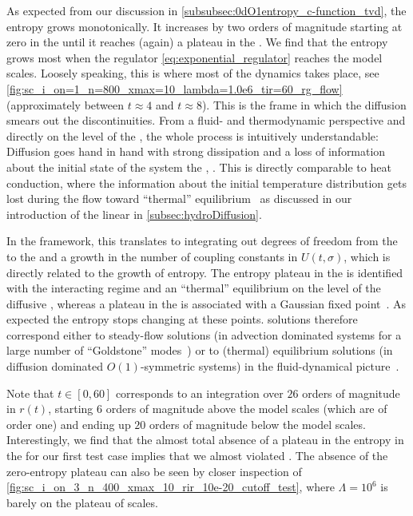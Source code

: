 As expected from our discussion in \cref{subsubsec:0dO1entropy_c-function_tvd}, the entropy grows monotonically.
It increases by two orders of magnitude starting at zero in the \uv{} until it reaches (again) a plateau in the \ir{}.
We find that the entropy grows most when the regulator \eqref{eq:exponential_regulator} reaches the model scales.
Loosely speaking, this is where most of the dynamics takes place, see \cref{fig:sc_i_on=1_n=800_xmax=10_lambda=1.0e6_tir=60_rg_flow} (approximately between $t \approx 4$ and $t \approx 8$).
This is the \rgtime{} frame in which the diffusion smears out the discontinuities.
From a fluid- and thermodynamic perspective and directly on the level of the \pde{}, the whole process is intuitively understandable: Diffusion goes hand in hand with strong dissipation and a loss of information about the initial state of the system \dash{} the \uv{}, \cf{} .
This is directly comparable to heat conduction, where the information about the initial temperature distribution gets lost during the flow toward ``thermal'' equilibrium~\cite{Cannon:1984,LeVeque:1992,Lebowitz:2008} as discussed in our introduction of the linear \heq{} in \cref{subsec:hydroDiffusion}.

In the \frg{} framework, this translates to integrating out degrees of freedom from the \uv{} to the \ir{} and a growth in the number of coupling constants in $U ( t, \sigma )$, which is directly related to the growth of entropy.
The entropy plateau in the \ir{} is identified with the interacting \ir{} regime and an ``thermal'' equilibrium on the level of the diffusive \pde{}, whereas a plateau in the \uv{} is associated with a Gaussian \uv{} fixed point~\cite{Zinn-Justin:2010,ZinnJustin:2002ru}.
As expected the entropy stops changing at these points.
\ir{} solutions therefore correspond either to steady-flow solutions (in advection dominated systems for a large number of ``Goldstone'' modes~\cite{Nambu:1960tm,Goldstone:1961eq,Goldstone:1962es}) or to (thermal) equilibrium solutions (in diffusion dominated $O(1)$-symmetric systems) in the fluid-dynamical picture~\cite{Koenigstein:2021syz}.

Note that $t \in [ 0, 60 ]$ corresponds to an integration over $26$ orders of magnitude in $r(t)$, starting $6$ orders of magnitude above the model scales (which are of order one) and ending up $20$ orders of magnitude below the model scales. 
Interestingly, we find that the almost total absence of a plateau in the entropy in the \uv{} for our first test case implies that we almost violated \rgcy{}.
The absence of the zero-entropy plateau can also be seen by closer inspection of \cref{fig:sc_i_on_3_n_400_xmax_10_rir_10e-20_cutoff_test}, where $\Lambda = 10^6$ is barely on the plateau of \rgct{} \uv{} scales.

